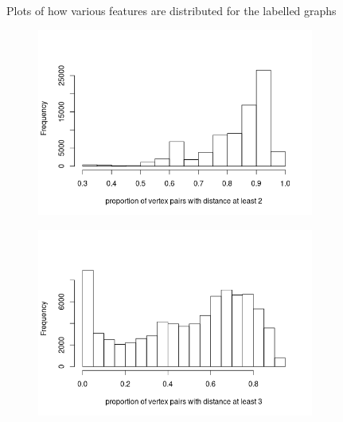 \documentclass{article}
\theoremstyle{definition}
\theoremstyle{remark}
\begin{document}
\begin{figure}
\begin{subfigure}[t]{0.49\textwidth}
  \end{subfigure}
  \caption{Plots of how various features are distributed for the labelled graphs}
  \label{fig:mcs_features1}
\end{figure}

\begin{figure}
  \begin{subfigure}[t]{0.49\textwidth}
    \centering
    \includegraphics[width=\textwidth]{mcs_prop2.png}
  \end{subfigure}
  \begin{subfigure}[t]{0.49\textwidth}
    \centering
    \includegraphics[width=\textwidth]{mcs_prop3.png}
  \end{subfigure}
  \begin{subfigure}[t]{0.49\textwidth}
    \centering

\end{subfigure}
\end{figure}
\end{document}

